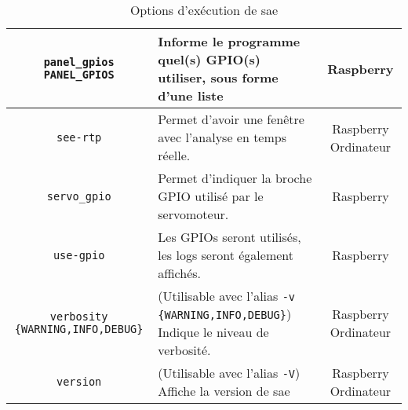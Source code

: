 \begin{table}[H]
\begin{tabularx}{\linewidth}{|c|X|c|}
        \verb=panel_gpios PANEL_GPIOS=               & Informe le programme quel(s) GPIO(s) utiliser, sous forme d'une liste                                                                                             & Raspberry               \\\hline
        \verb=see-rtp=                               & Permet d'avoir une fenêtre avec l'analyse en temps réelle.                                                                                                        & Raspberry Ordinateur    \\\hline
        \verb=servo_gpio=                            & Permet d'indiquer la broche GPIO utilisé par le servomoteur.                                                                                                      & Raspberry               \\\hline
        \verb=use-gpio=                              & Les GPIOs seront utilisés, les logs seront également affichés.                                                                                                    & Raspberry               \\\hline
        \verb=verbosity {WARNING,INFO,DEBUG}=        & (Utilisable avec l'alias \verb=-v {WARNING,INFO,DEBUG}=) Indique le niveau de verbosité.                                                                          & Raspberry Ordinateur    \\\hline
        \verb=version=                               & (Utilisable avec l'alias \verb=-V=) Affiche la version de \gls{sae}                                                                                               & Raspberry Ordinateur    \\\hline
    \end{tabularx}
    \label{tabOptClearway}
    \caption{Options d'exécution de \gls{sae}}
\end{table}

